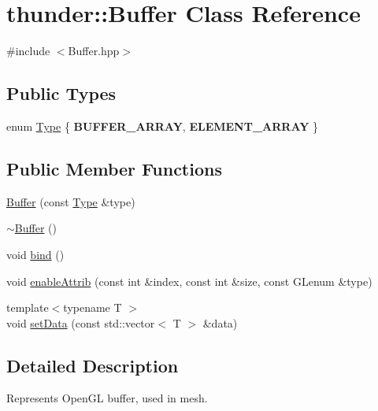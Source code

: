 \hypertarget{classthunder_1_1_buffer}{}\section{thunder\+:\+:Buffer Class Reference}
\label{classthunder_1_1_buffer}


{\ttfamily \#include $<$Buffer.\+hpp$>$}

\subsection*{Public Types}
\begin{DoxyCompactItemize}
\item 
enum \mbox{\hyperlink{classthunder_1_1_buffer_af4777908dbe80eb3fd327e1a489d43ad}{Type}} \{ {\bfseries B\+U\+F\+F\+E\+R\+\_\+\+A\+R\+R\+AY}, 
{\bfseries E\+L\+E\+M\+E\+N\+T\+\_\+\+A\+R\+R\+AY}
 \}
\end{DoxyCompactItemize}
\subsection*{Public Member Functions}
\begin{DoxyCompactItemize}
\item 
\mbox{\hyperlink{classthunder_1_1_buffer_a583c81e036ea9533a97215b7a79d843c}{Buffer}} (const \mbox{\hyperlink{classthunder_1_1_buffer_af4777908dbe80eb3fd327e1a489d43ad}{Type}} \&type)
\item 
\mbox{\hyperlink{classthunder_1_1_buffer_a2df5bdd1d256a1a162ea9f28a70669eb}{$\sim$\+Buffer}} ()
\item 
void \mbox{\hyperlink{classthunder_1_1_buffer_a9f293efe84c7955d1e9fdeb7cec3be60}{bind}} ()
\item 
void \mbox{\hyperlink{classthunder_1_1_buffer_aaaa57bcdc160b80a0a4f8a39da51407a}{enable\+Attrib}} (const int \&index, const int \&size, const G\+Lenum \&type)
\item 
{\footnotesize template$<$typename T $>$ }\\void \mbox{\hyperlink{classthunder_1_1_buffer_af324ab8ee226c7147eb87e85cd6b3f08}{set\+Data}} (const std\+::vector$<$ T $>$ \&data)
\end{DoxyCompactItemize}


\subsection{Detailed Description}
Represents Open\+GL buffer, used in mesh. 

